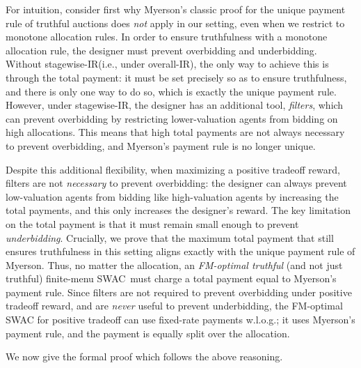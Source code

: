 \documentclass[11pt,letterpaper]{article}
\newcommand{\swir}{stagewise-IR\xspace}
\newcommand{\oir}{overall-IR\xspace}
\newcommand{\fr}{fixed-rate\xspace}
\newcommand{\swac}{SWAC\xspace}
\newcommand{\finauc}{finite-menu \swac}
\theoremstyle{plain}
\begin{document}
For intuition, consider first why Myerson's classic proof for the unique payment rule of truthful auctions does \emph{not} apply in our setting, even when 
we restrict to monotone allocation rules.
In order to ensure truthfulness with a monotone allocation rule, the designer must prevent overbidding and underbidding. Without \swir (i.e., under \oir), the only way to
achieve this is through the total payment: it must be set precisely so as to ensure truthfulness, and there is only one way to do so, which is exactly the unique payment rule.
However, under \swir, the designer has an additional tool, \emph{filters}, which can prevent overbidding by restricting lower-valuation agents from bidding on high allocations.
This means that high total payments are not always necessary to prevent overbidding,
and Myerson's payment rule is no longer unique.

Despite this additional flexibility, when maximizing a positive tradeoff reward,
filters are not \emph{necessary} to prevent overbidding:
the designer can always prevent low-valuation agents from bidding like high-valuation agents by increasing the total payments,
and this only increases the designer's reward.
The key limitation on the total payment is that it must remain small enough to prevent \emph{underbidding}.
Crucially, we prove that the maximum total payment that still ensures truthfulness in this setting aligns exactly with the unique payment rule of Myerson. Thus, no matter the allocation, an \emph{FM-optimal truthful} (and not just truthful) \finauc\ must charge a total payment equal to Myerson’s payment rule.
Since filters are not required to prevent overbidding under positive tradeoff reward, and are \emph{never} useful to prevent underbidding,
the FM-optimal \swac for positive tradeoff can use \fr payments w.l.o.g.;
it uses Myerson's payment rule, and the payment is equally split over the allocation.

We now give the formal proof which follows the above reasoning.
\end{document}
